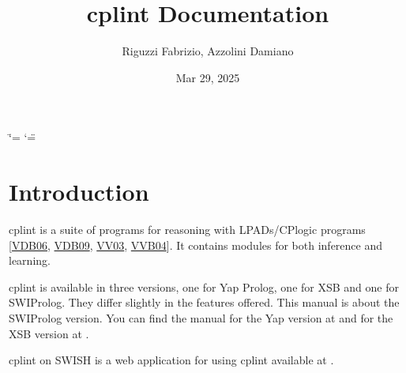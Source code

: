 \documentclass[letterpaper,10pt,english]{sphinxmanual}
\title{cplint Documentation}
\date{Mar 29, 2025}
\author{Riguzzi Fabrizio, Azzolini Damiano}
\begin{document}
\ifdefined\shorthandoff
  \ifnum\catcode`\=\string=\active\shorthandoff{=}\fi
  \ifnum\catcode`\"=\active{}\fi
\fi

\pagestyle{empty}
\sphinxmaketitle
\pagestyle{plain}
\sphinxtableofcontents
\pagestyle{normal}
\label{\detokenize{index::doc}}



\chapter{Introduction}
\label{\detokenize{index:introduction}}
\sphinxAtStartPar
cplint is a suite of programs for reasoning with LPADs/CP\sphinxhyphen{}logic programs {[}\hyperlink{cite.index:id71}{VDB06}, \hyperlink{cite.index:id72}{VDB09}, \hyperlink{cite.index:id70}{VV03}, \hyperlink{cite.index:id50}{VVB04}{]}.
It contains modules for both inference and learning.

\sphinxAtStartPar
cplint is available in three versions, one for Yap Prolog, one for XSB and one for SWI\sphinxhyphen{}Prolog.
They differ slightly in the features offered.
This manual is about the SWI\sphinxhyphen{}Prolog version.
You can find the manual for the Yap version at  and
for the XSB version at .

\sphinxAtStartPar
cplint on SWISH is a web application for using cplint available at .
\end{document}
